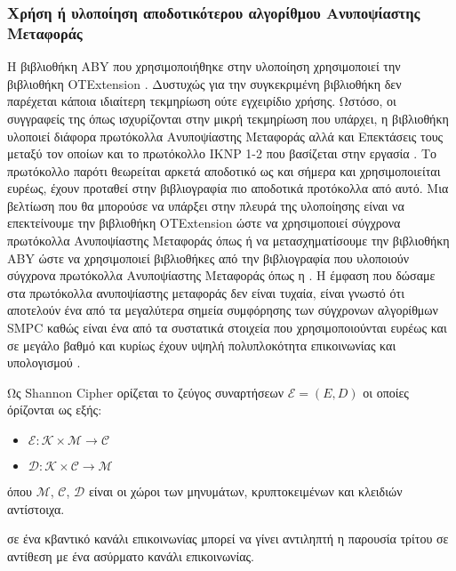 \subsubsection{Χρήση ή υλοποίηση αποδοτικότερου αλγορίθμου Ανυποψίαστης Μεταφοράς}
Η βιβλιοθήκη ABY που χρησιμοποιήθηκε στην υλοποίηση χρησιμοποιεί την βιβλιοθήκη OTExtension \cite{OTExtensions}. Δυστυχώς για την συγκεκριμένη βιβλιοθήκη δεν παρέχεται κάποια ιδιαίτερη τεκμηρίωση ούτε εγχειρίδιο χρήσης. Ωστόσο, οι συγγραφείς της όπως ισχυρίζονται στην μικρή τεκμηρίωση που υπάρχει, η βιβλιοθήκη υλοποιεί διάφορα πρωτόκολλα Ανυποψίαστης Μεταφοράς αλλά και Επεκτάσεις τους μεταξύ τον οποίων και το πρωτόκολλο IKNP 1-2 που βασίζεται στην εργασία \cite{ishai2003extending}. Το πρωτόκολλο παρότι θεωρείται αρκετά αποδοτικό ως και σήμερα και χρησιμοποιείται ευρέως, έχουν προταθεί στην βιβλιογραφία πιο αποδοτικά προτόκολλα από αυτό. Μια βελτίωση που θα μπορούσε να υπάρξει στην πλευρά της υλοποίησης είναι να επεκτείνουμε την βιβλιοθήκη OTExtension ώστε να χρησιμοποιεί σύγχρονα πρωτόκολλα Ανυποψίαστης Μεταφοράς όπως  ή να μετασχηματίσουμε την βιβλιοθήκη ABY ώστε να χρησιμοποιεί βιβλιοθήκες από την βιβλιογραφία που υλοποιούν σύγχρονα πρωτόκολλα Ανυποψίαστης Μεταφοράς όπως η \cite{libOTe}. H έμφαση που δώσαμε στα πρωτόκολλα ανυποψίαστης μεταφοράς δεν είναι τυχαία, είναι γνωστό ότι αποτελούν ένα από τα μεγαλύτερα σημεία συμφόρησης των σύγχρονων αλγορίθμων SMPC καθώς είναι ένα από τα  συστατικά στοιχεία που χρησιμοποιούνται ευρέως και σε μεγάλο βαθμό και κυρίως έχουν υψηλή πολυπλοκότητα επικοινωνίας και υπολογισμού .



\begin{definition}
    Ως Shannon Cipher ορίζεται το ζεύγος συναρτήσεων $\mathcal{E} = (E,D)$ οι οποίες όρίζονται ως εξής:
    \begin{itemize}
        \item $\mathcal{E} : \mathcal{K} \times \mathcal{M} \rightarrow \mathcal{C}$
        \item $\mathcal{D} : \mathcal{K} \times \mathcal{C} \rightarrow \mathcal{M}$
    \end{itemize}
    όπου $\mathcal{M}$, $\mathcal{C}$, $\mathcal{D}$ είναι οι χώροι των μηνυμάτων, κρυπτοκειμένων και κλειδιών αντίστοιχα.
    \end{definition}
    
     σε ένα κβαντικό κανάλι επικοινωνίας μπορεί να γίνει αντιληπτή η παρουσία τρίτου σε αντίθεση με ένα ασύρματο κανάλι επικοινωνίας.
     
